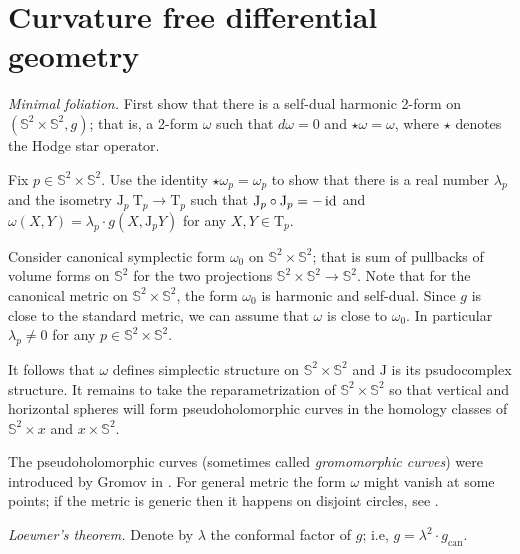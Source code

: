 \section*{Curvature free differential geometry}

\textit{Minimal foliation.}
First show that there is a self-dual harmonic 2-form on $(\mathbb{S}^2\times\mathbb{S}^2,g)$;
that is, a 2-form $\omega$ such that $d\omega=0$ and $\star\omega=\omega$,
where $\star$ denotes the Hodge star operator.

Fix $p\in \mathbb{S}^2\times\mathbb{S}^2$.
Use the identity $\star\omega_p=\omega_p$
to show that
there is a real number $\lambda_p$ and the isometry $\mathrm{J}_p\:\mathrm{T}_p\to\mathrm{T}_p$ 
such that
$\mathrm{J}_p\circ\mathrm{J}_p =-\operatorname{\rm id}$ 
and 
$\omega(X,Y)=\lambda_p\cdot g(X,\mathrm{J}_pY)$ for any $X,Y\in \mathrm{T}_p$.

Consider canonical symplectic form $\omega_0$ on $\mathbb{S}^2\times\mathbb{S}^2$;
that is sum of pullbacks of volume forms on $\mathbb{S}^2$  
for the two projections $\mathbb{S}^2\times\mathbb{S}^2\to \mathbb{S}^2$.
Note that for the canonical metric on $\mathbb{S}^2\times\mathbb{S}^2$,
the form $\omega_0$ is harmonic and self-dual. 
Since $g$ is close to the standard metric,
we can assume that $\omega$ is close to $\omega_0$.
In particular $\lambda_p\ne0$ for any $p\in \mathbb{S}^2\times\mathbb{S}^2$.

It follows that $\omega$ defines simplectic structure on $\mathbb{S}^2\times\mathbb{S}^2$
and $\mathrm{J}$ is its psudocomplex structure.
It remains to take the reparametrization of $\mathbb{S}^2\times \mathbb{S}^2$
so that vertical and horizontal spheres will form pseudoholomorphic curves in the homology classes of $\mathbb{S}^2\times x$ and $x\times \mathbb{S}^2$.
 
 The pseudoholomorphic curves (sometimes called \emph{gromomorphic curves}) 
were introduced by Gromov in \cite{gromov-pseudoholomorphic}.
For general metric the form $\omega$ might vanish at some points;
if the metric is generic then it happens on disjoint circles,
see \cite{honda}.





\textit{Loewner's theorem.}
Denote by $\lambda$ the conformal factor of $g$;
i.e, $g=\lambda^2\cdot g_{\mathrm{can}}$.

